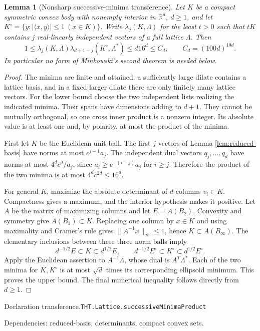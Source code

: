 \documentclass[11pt]{article}
\newtheorem{lemma}[theorem]{Lemma}
\theoremstyle{definition}
\newcommand{\R}{\mathbb R}
\numberwithin{equation}{section}
\newcommand{\bp}[3]{\par\smallskip\begingroup\footnotesize
\noindent\hypertarget{bp:#1}{\textsf{Declaration #1.}}\quad\nolinkurl{#2}\par
\noindent\textsf{Dependencies:} #3.\par\endgroup\smallskip}
\begin{document}
\begin{lemma}[Nonsharp successive-minima transference]\label{lem:transference}
Let $K$ be a compact symmetric convex body with nonempty interior in $\R^d$, $d\ge1$, and let $K^\circ=\{y:|\langle x,y\rangle|\le1\ (x\in K)\}$. Write $\lambda_j(K,\Lambda)$ for the least $t>0$ such that $tK$ contains $j$ real-linearly independent vectors of a full lattice $\Lambda$. Then
\[
 1\le \lambda_j(K,\Lambda)\lambda_{d+1-j}(K^\circ,\Lambda^*)
 \le d16^d\le C_d,\qquad C_d=(100d)^{10d}.
\]
In particular no form of Minkowski's second theorem is needed below.
\end{lemma}
\begin{proof}
The minima are finite and attained: a sufficiently large dilate contains a lattice basis, and in a fixed larger dilate there are only finitely many lattice vectors. For the lower bound choose the two independent lists realizing the indicated minima. Their spans have dimensions adding to $d+1$. They cannot be mutually orthogonal, so one cross inner product is a nonzero integer. Its absolute value is at least one and, by polarity, at most the product of the minima.

First let $K$ be the Euclidean unit ball. The first $j$ vectors of Lemma \ref{lem:reduced-basis} have norms at most $c^{j-1}a_j$. The independent dual vectors $q_j,\ldots,q_d$ have norms at most $4^dc^d/a_j$, since $a_i\ge c^{-(i-j)}a_j$ for $i\ge j$. Therefore the product of the two minima is at most $4^dc^{2d}\le16^d$.

For general $K$, maximize the absolute determinant of $d$ columns $v_i\in K$. Compactness gives a maximum, and the interior hypothesis makes it positive. Let $A$ be the matrix of maximizing columns and let $E=A(B_2)$. Convexity and symmetry give $A(B_1)\subset K$. Replacing one column by $x\in K$ and using maximality and Cramer's rule gives $\|A^{-1}x\|_\infty\le1$, hence $K\subset A(B_\infty)$. The elementary inclusions between these three norm balls imply
\[
 d^{-1/2}E\subset K\subset d^{1/2}E,
 \qquad d^{-1/2}E^\circ\subset K^\circ\subset d^{1/2}E^\circ.
\]
Apply the Euclidean assertion to $A^{-1}\Lambda$, whose dual is $A^T\Lambda^*$. Each of the two minima for $K,K^\circ$ is at most $\sqrt d$ times its corresponding ellipsoid minimum. This proves the upper bound. The final numerical inequality follows directly from $d\ge1$.
\end{proof}
\bp{transference}{THT.Lattice.successiveMinimaProduct}{reduced-basis, determinants, compact convex sets}
\end{document}
